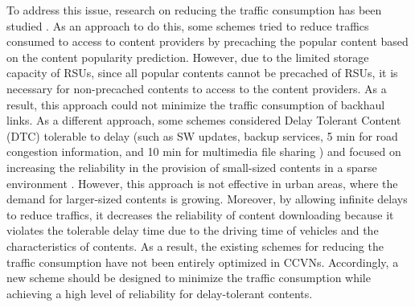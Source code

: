 \documentclass{ieeeaccess}
\begin{document}
To address this issue, research on reducing the traffic consumption has been studied \cite{Ostrovskaya2018, Marica2021, Amit2019}.
As an approach to do this, some schemes tried to reduce traffics consumed to access to content providers by precaching the popular content based on the content popularity prediction.
However, due to the limited storage capacity of RSUs, since all popular contents cannot be precached of RSUs, it is necessary for non-precached contents to access to the content providers.
As a result, this approach could not minimize the traffic consumption of backhaul links. 
As a different approach, some schemes considered Delay Tolerant Content (DTC) tolerable to delay (such as SW updates, backup services, 5 min for road congestion information, and 10 min for multimedia file sharing \cite{Lee2014, Chen2009}) and focused on increasing the reliability in the provision of small-sized contents in a sparse environment \cite{Qi2017, Vigneri2019, Xia2020}.
However, this approach is not effective in urban areas, where the demand for larger-sized contents is growing.
Moreover, by allowing infinite delays to reduce traffics, it decreases the reliability of content downloading because it violates the tolerable delay time due to the driving time of vehicles and the characteristics of contents.
As a result, the existing schemes for reducing the traffic consumption have not been entirely optimized in CCVNs.
Accordingly, a new scheme should be designed to minimize the traffic consumption while achieving a high level of reliability for delay-tolerant contents.
\end{document}
